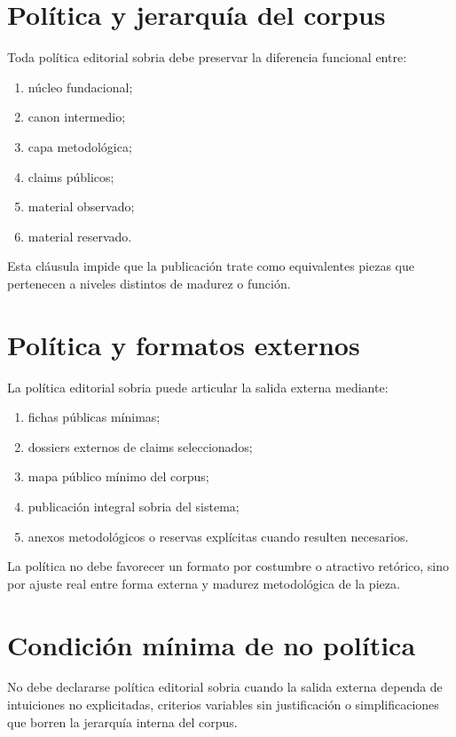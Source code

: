 \section{Política y jerarquía del corpus}
\begin{definition}
Toda política editorial sobria debe preservar la diferencia funcional entre:
\begin{enumerate}
  \item núcleo fundacional;
  \item canon intermedio;
  \item capa metodológica;
  \item claims públicos;
  \item material observado;
  \item material reservado.
\end{enumerate}
\end{definition}

\begin{observation}
Esta cláusula impide que la publicación trate como equivalentes piezas que pertenecen a niveles distintos de madurez o función.
\end{observation}

\section{Política y formatos externos}
\begin{definition}
La política editorial sobria puede articular la salida externa mediante:
\begin{enumerate}
  \item fichas públicas mínimas;
  \item dossiers externos de claims seleccionados;
  \item mapa público mínimo del corpus;
  \item publicación integral sobria del sistema;
  \item anexos metodológicos o reservas explícitas cuando resulten necesarios.
\end{enumerate}
\end{definition}

\begin{observation}
La política no debe favorecer un formato por costumbre o atractivo retórico, sino por ajuste real entre forma externa y madurez metodológica de la pieza.
\end{observation}

\section{Condición mínima de no política}
\begin{definition}
No debe declararse política editorial sobria cuando la salida externa dependa de intuiciones no explicitadas, criterios variables sin justificación o simplificaciones que borren la jerarquía interna del corpus.
\end{definition}

